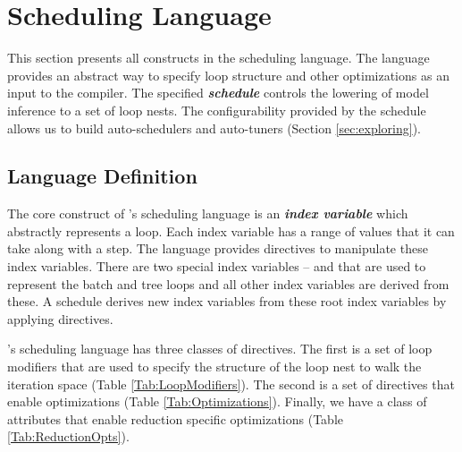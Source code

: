 \section{Scheduling Language}
\label{sec:schedule}
This section presents all constructs in the scheduling language. 
The language provides an abstract way to specify loop structure and 
other optimizations as an input to the compiler. The specified 
\textbf{\emph{schedule}} controls the lowering of model inference to a set of 
loop nests. The configurability provided by the schedule allows us 
to build auto-schedulers and auto-tuners (Section \ref{sec:exploring}).


\subsection{Language Definition}
The core construct of \Treebeard{}'s scheduling language is an 
\textbf{\emph{index variable}} which abstractly represents a loop. 
Each index variable has a range of values that it can take along 
with a step. 
The language provides directives to manipulate these index 
variables. There are two special index variables --  and
 that are used to represent the batch and tree loops and all 
other index variables are derived from these. A schedule derives 
new index variables from these root index variables by applying
directives. 

\Treebeard{}'s scheduling language has three classes of directives. The first is a set 
of loop modifiers that are used to specify the structure of the loop nest to
walk the iteration space (Table \ref{Tab:LoopModifiers}). The second is a set of 
directives that enable optimizations (Table \ref{Tab:Optimizations}). 
Finally, we have a class of attributes that enable reduction specific optimizations
(Table \ref{Tab:ReductionOpts}).

